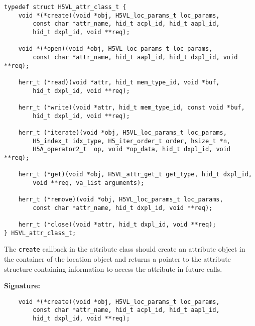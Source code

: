 \begin{lstlisting}
typedef struct H5VL_attr_class_t {
    void *(*create)(void *obj, H5VL_loc_params_t loc_params, 
        const char *attr_name, hid_t acpl_id, hid_t aapl_id, 
        hid_t dxpl_id, void **req);

    void *(*open)(void *obj, H5VL_loc_params_t loc_params, 
        const char *attr_name, hid_t aapl_id, hid_t dxpl_id, void **req);

    herr_t (*read)(void *attr, hid_t mem_type_id, void *buf, 
        hid_t dxpl_id, void **req);

    herr_t (*write)(void *attr, hid_t mem_type_id, const void *buf, 
        hid_t dxpl_id, void **req);

    herr_t (*iterate)(void *obj, H5VL_loc_params_t loc_params,
        H5_index_t idx_type, H5_iter_order_t order, hsize_t *n, 
        H5A_operator2_t  op, void *op_data, hid_t dxpl_id, void **req);

    herr_t (*get)(void *obj, H5VL_attr_get_t get_type, hid_t dxpl_id, 
        void **req, va_list arguments);

    herr_t (*remove)(void *obj, H5VL_loc_params_t loc_params, 
        const char *attr_name, hid_t dxpl_id, void **req);

    herr_t (*close)(void *attr, hid_t dxpl_id, void **req);
} H5VL_attr_class_t;
\end{lstlisting}

The {\tt create} callback in the attribute class should create an
attribute object in the container of the location object and
returns a pointer to the attribute structure containing information to
access the attribute in future calls. 

\textbf{Signature:}
\begin{lstlisting}
    void *(*create)(void *obj, H5VL_loc_params_t loc_params, 
        const char *attr_name, hid_t acpl_id, hid_t aapl_id, 
        hid_t dxpl_id, void **req);
\end{lstlisting}

